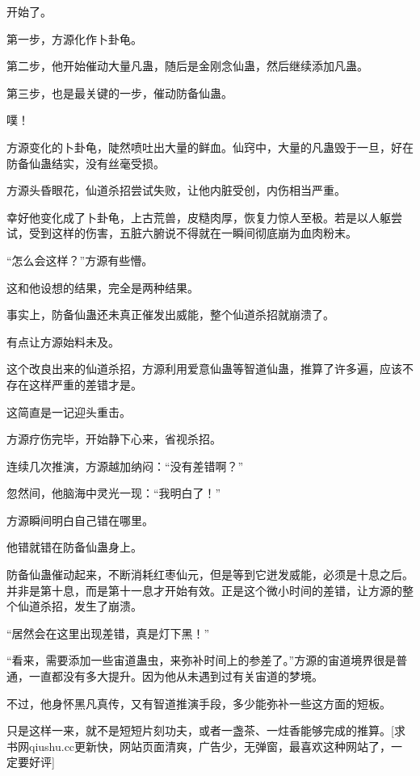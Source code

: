 
\begin{this_body}

开始了。

第一步，方源化作卜卦龟。

第二步，他开始催动大量凡蛊，随后是金刚念仙蛊，然后继续添加凡蛊。

第三步，也是最关键的一步，催动防备仙蛊。

噗！

方源变化的卜卦龟，陡然喷吐出大量的鲜血。仙窍中，大量的凡蛊毁于一旦，好在防备仙蛊结实，没有丝毫受损。

方源头昏眼花，仙道杀招尝试失败，让他内脏受创，内伤相当严重。

幸好他变化成了卜卦龟，上古荒兽，皮糙肉厚，恢复力惊人至极。若是以人躯尝试，受到这样的伤害，五脏六腑说不得就在一瞬间彻底崩为血肉粉末。

“怎么会这样？”方源有些懵。

这和他设想的结果，完全是两种结果。

事实上，防备仙蛊还未真正催发出威能，整个仙道杀招就崩溃了。

有点让方源始料未及。

这个改良出来的仙道杀招，方源利用爱意仙蛊等智道仙蛊，推算了许多遍，应该不存在这样严重的差错才是。

这简直是一记迎头重击。

方源疗伤完毕，开始静下心来，省视杀招。

连续几次推演，方源越加纳闷：“没有差错啊？”

忽然间，他脑海中灵光一现：“我明白了！”

方源瞬间明白自己错在哪里。

他错就错在防备仙蛊身上。

防备仙蛊催动起来，不断消耗红枣仙元，但是等到它迸发威能，必须是十息之后。并非是第十息，而是第十一息才开始有效。正是这个微小时间的差错，让方源的整个仙道杀招，发生了崩溃。

“居然会在这里出现差错，真是灯下黑！”

“看来，需要添加一些宙道蛊虫，来弥补时间上的参差了。”方源的宙道境界很是普通，一直都没有多大提升。因为他从未遇到过有关宙道的梦境。

不过，他身怀黑凡真传，又有智道推演手段，多少能弥补一些这方面的短板。

只是这样一来，就不是短短片刻功夫，或者一盏茶、一炷香能够完成的推算。[求书网qiushu.cc更新快，网站页面清爽，广告少，无弹窗，最喜欢这种网站了，一定要好评]


\end{this_body}
